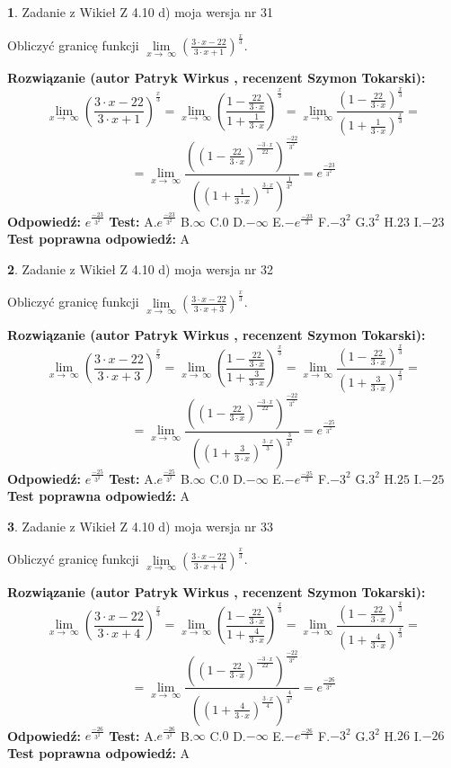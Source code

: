 \documentclass[12pt, a4paper]{article}
\theoremstyle{definition} %
\newtheorem{zad}{}
\newcommand{\zadStart}[1]{\begin{zad}#1\newline}
\newcommand{\zadStop}{\end{zad}}
\newcommand{\rozwStart}[2]{\noindent \textbf{Rozwiązanie (autor #1 , recenzent #2): }\newline}
\newcommand{\rozwStop}{\newline}
\newcommand{\odpStart}{\noindent \textbf{Odpowiedź:}\newline}
\newcommand{\odpStop}{\newline}
\newcommand{\testStart}{\noindent \textbf{Test:}\newline}
\newcommand{\testStop}{\newline}
\newcommand{\kluczStart}{\noindent \textbf{Test poprawna odpowiedź:}\newline}
\newcommand{\kluczStop}{\newline}
\begin{document}
\zadStart{Zadanie z Wikieł Z 4.10 d) moja wersja nr 31}


Obliczyć granicę funkcji  $\lim\limits_{x\to\ \infty}(\frac{3\cdot x-22}{3\cdot x+1})^{\frac{x}{3}}$.
\zadStop
\rozwStart{Patryk Wirkus}{Szymon Tokarski}
$$\lim\limits_{x\to\ \infty}(\frac{3\cdot x-22}{3\cdot x+1})^{\frac{x}{3}} = \lim\limits_{x\to\ \infty}(\frac{1-\frac{22}{3\cdot x}}{1+\frac{1}{3\cdot x}})^{\frac{x}{3}}=\lim\limits_{x\to\ \infty}\frac{(1-\frac{22}{3\cdot x})^{\frac{x}{3}}}{(1+\frac{1}{3\cdot x})^{\frac{x}{3}}}=$$
$$=\lim\limits_{x\to\ \infty}\frac{((1-\frac{22}{3\cdot x})^{\frac{-3\cdot x}{22}})^{\frac{-22}{3^{2}}}}{((1+\frac{1}{3\cdot x})^{\frac{3\cdot x}{1}})^{\frac{1}{3^{2}}}}=e^{\frac{-23}{3^{2}}}$$
\rozwStop
\odpStart
$e^{\frac{-23}{3^{2}}}$
\odpStop
\testStart
A.$e^{\frac{-23}{3^{2}}}$ B.$\infty$ C.$0$ D.$-\infty$ E.$-e^{\frac{-23}{3}}$
F.$-3^{2}$ G.$3^{2}$
H.$23$
I.$-23$
\testStop
\kluczStart
A
\kluczStop



\zadStart{Zadanie z Wikieł Z 4.10 d) moja wersja nr 32}


Obliczyć granicę funkcji  $\lim\limits_{x\to\ \infty}(\frac{3\cdot x-22}{3\cdot x+3})^{\frac{x}{3}}$.
\zadStop
\rozwStart{Patryk Wirkus}{Szymon Tokarski}
$$\lim\limits_{x\to\ \infty}(\frac{3\cdot x-22}{3\cdot x+3})^{\frac{x}{3}} = \lim\limits_{x\to\ \infty}(\frac{1-\frac{22}{3\cdot x}}{1+\frac{3}{3\cdot x}})^{\frac{x}{3}}=\lim\limits_{x\to\ \infty}\frac{(1-\frac{22}{3\cdot x})^{\frac{x}{3}}}{(1+\frac{3}{3\cdot x})^{\frac{x}{3}}}=$$
$$=\lim\limits_{x\to\ \infty}\frac{((1-\frac{22}{3\cdot x})^{\frac{-3\cdot x}{22}})^{\frac{-22}{3^{2}}}}{((1+\frac{3}{3\cdot x})^{\frac{3\cdot x}{3}})^{\frac{3}{3^{2}}}}=e^{\frac{-25}{3^{2}}}$$
\rozwStop
\odpStart
$e^{\frac{-25}{3^{2}}}$
\odpStop
\testStart
A.$e^{\frac{-25}{3^{2}}}$ B.$\infty$ C.$0$ D.$-\infty$ E.$-e^{\frac{-25}{3}}$
F.$-3^{2}$ G.$3^{2}$
H.$25$
I.$-25$
\testStop
\kluczStart
A
\kluczStop



\zadStart{Zadanie z Wikieł Z 4.10 d) moja wersja nr 33}


Obliczyć granicę funkcji  $\lim\limits_{x\to\ \infty}(\frac{3\cdot x-22}{3\cdot x+4})^{\frac{x}{3}}$.
\zadStop
\rozwStart{Patryk Wirkus}{Szymon Tokarski}
$$\lim\limits_{x\to\ \infty}(\frac{3\cdot x-22}{3\cdot x+4})^{\frac{x}{3}} = \lim\limits_{x\to\ \infty}(\frac{1-\frac{22}{3\cdot x}}{1+\frac{4}{3\cdot x}})^{\frac{x}{3}}=\lim\limits_{x\to\ \infty}\frac{(1-\frac{22}{3\cdot x})^{\frac{x}{3}}}{(1+\frac{4}{3\cdot x})^{\frac{x}{3}}}=$$
$$=\lim\limits_{x\to\ \infty}\frac{((1-\frac{22}{3\cdot x})^{\frac{-3\cdot x}{22}})^{\frac{-22}{3^{2}}}}{((1+\frac{4}{3\cdot x})^{\frac{3\cdot x}{4}})^{\frac{4}{3^{2}}}}=e^{\frac{-26}{3^{2}}}$$
\rozwStop
\odpStart
$e^{\frac{-26}{3^{2}}}$
\odpStop
\testStart
A.$e^{\frac{-26}{3^{2}}}$ B.$\infty$ C.$0$ D.$-\infty$ E.$-e^{\frac{-26}{3}}$
F.$-3^{2}$ G.$3^{2}$
H.$26$
I.$-26$
\testStop
\kluczStart
A
\kluczStop
\end{document}
